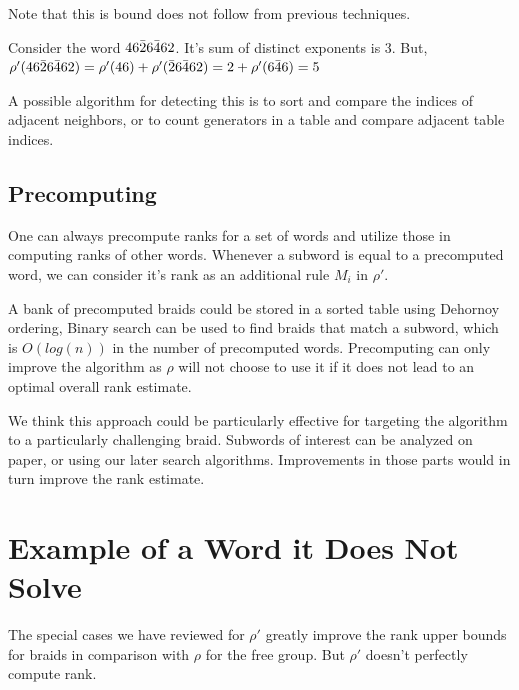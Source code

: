 \documentclass[12pt]{thesis}
\begin{document}
Note that this is bound does not follow from previous techniques.
\begin{example}
Consider the word $4 6 \bar{2} 6 \bar{4} 6 2$.
It's sum of distinct exponents is $3$.
But,
$\rho'(4 6 \bar{2} 6 \bar{4} 6 2) = \rho'(4 6) + \rho'(\bar{2} 6 \bar{4} 6 2) = 2 + \rho'(6 \bar{4} 6) = 5$
\end{example}

A possible algorithm for detecting this
is to sort and compare the indices of adjacent neighbors,
or to count generators in a table and compare adjacent table indices.

\subsection{Precomputing}

One can always precompute ranks for a set of words
and utilize those in computing ranks of other words.
Whenever a subword is equal to a precomputed
word, 
we can consider it's rank as an additional rule $M_{i}$ in $\rho'$.

A bank of precomputed braids could be stored in a sorted table
using Dehornoy ordering, 
Binary search can be used to find braids that match a subword, which is $O(log(n))$
in the number of precomputed words.
Precomputing can only improve the algorithm as $\rho$ will
not choose to use it
if it does not lead to an optimal overall rank estimate.

We think this approach could be particularly effective for targeting
the algorithm to a particularly challenging braid.
Subwords of interest can be analyzed on paper, or using our later search algorithms.
Improvements in those parts would in turn improve the rank estimate.

\section{Example of a Word it Does Not Solve}

The special cases we have reviewed for $\rho'$ greatly improve the rank upper bounds
for braids in comparison with $\rho$ for the free group.
But $\rho'$ doesn't perfectly compute rank.
\end{document}
